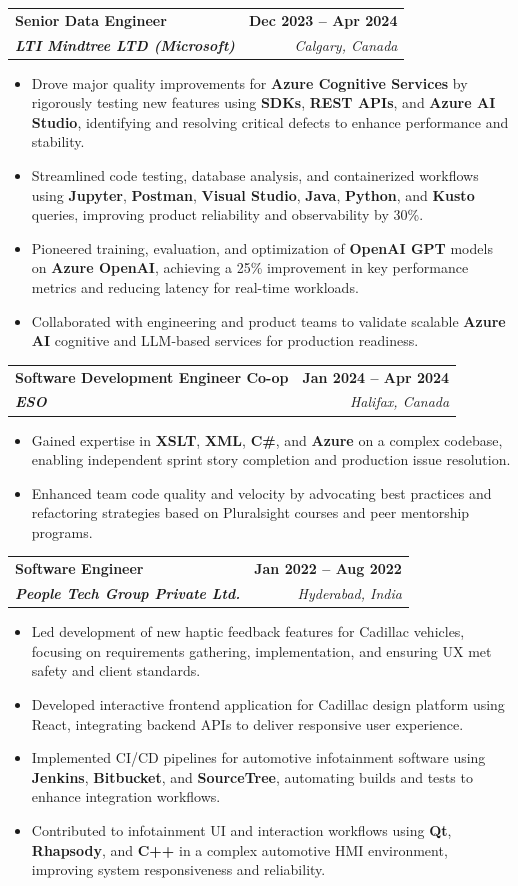 \documentclass[letterpaper,11pt]{article}
\makeatletter
\newcommand{\resumeItem}[1]{
  \item\small{
    {#1 \vspace{-2pt}}
  }
}
\newcommand{\resumeSubheading}[4]{
  \vspace{-2pt}\item
    \begin{tabular*}{1.0\textwidth}[t]{l@{\extracolsep{\fill}}r}
      \textbf{#1} & \textbf{\small #2} \\
      \textit{\small#3} & \textit{\small #4} \\
    \end{tabular*}\vspace{-7pt}
}
\newcommand{\resumeItemListStart}{\begin{itemize}}
\newcommand{\resumeItemListEnd}{\end{itemize}\vspace{-5pt}}
\makeatother
\begin{document}
    \resumeSubheading
      {\textbf{Senior Data Engineer}}{\textbf{Dec 2023 -- Apr 2024}}
      {\textbf{LTI Mindtree LTD (Microsoft)}}{Calgary, Canada}
      \resumeItemListStart
        \resumeItem{Drove major quality improvements for \textbf{Azure Cognitive Services} by rigorously testing new features using \textbf{SDKs}, \textbf{REST APIs}, and \textbf{Azure AI Studio}, identifying and resolving critical defects to enhance performance and stability.}
        \resumeItem{Streamlined code testing, database analysis, and containerized workflows using \textbf{Jupyter}, \textbf{Postman}, \textbf{Visual Studio}, \textbf{Java}, \textbf{Python}, and \textbf{Kusto} queries, improving product reliability and observability by 30\%.}
        \resumeItem{Pioneered training, evaluation, and optimization of \textbf{OpenAI GPT} models on \textbf{Azure OpenAI}, achieving a 25\% improvement in key performance metrics and reducing latency for real-time workloads.}
        \resumeItem{Collaborated with engineering and product teams to validate scalable \textbf{Azure AI} cognitive and LLM-based services for production readiness.}
      \resumeItemListEnd
    
    \resumeSubheading
      {\textbf{Software Development Engineer Co-op}}{\textbf{Jan 2024 -- Apr 2024}}
      {\textbf{ESO}}{Halifax, Canada}
      \resumeItemListStart
        \resumeItem{Gained expertise in \textbf{XSLT}, \textbf{XML}, \textbf{C\#}, and \textbf{Azure} on a complex codebase, enabling independent sprint story completion and production issue resolution.}
        \resumeItem{Enhanced team code quality and velocity by advocating best practices and refactoring strategies based on Pluralsight courses and peer mentorship programs.}
      \resumeItemListEnd

    \resumeSubheading
      {\textbf{Software Engineer}}{\textbf{Jan 2022 -- Aug 2022}}
      {\textbf{People Tech Group Private Ltd.}}{Hyderabad, India}
      \resumeItemListStart
        \resumeItem{Led development of new haptic feedback features for Cadillac vehicles, focusing on requirements gathering, implementation, and ensuring UX met safety and client standards.}
        \resumeItem{Developed interactive frontend application for Cadillac design platform using React, integrating backend APIs to deliver responsive user experience.}
        \resumeItem{Implemented CI/CD pipelines for automotive infotainment software using \textbf{Jenkins}, \textbf{Bitbucket}, and \textbf{SourceTree}, automating builds and tests to enhance integration workflows.}
        \resumeItem{Contributed to infotainment UI and interaction workflows using \textbf{Qt}, \textbf{Rhapsody}, and \textbf{C++} in a complex automotive HMI environment, improving system responsiveness and reliability.}
      \resumeItemListEnd
\end{document}
